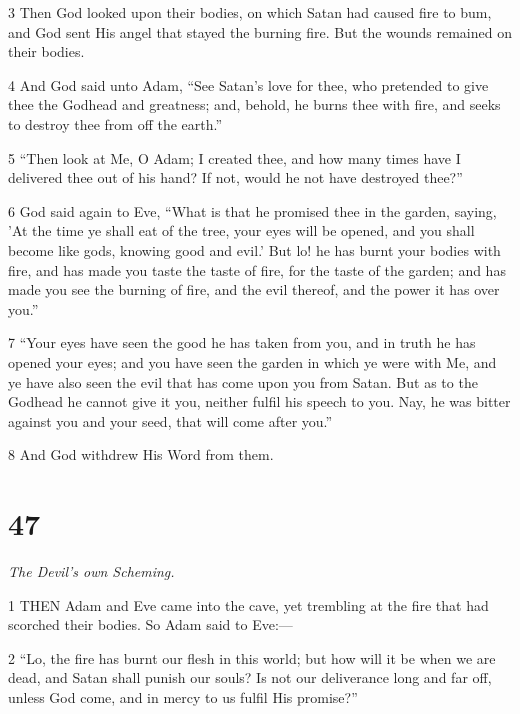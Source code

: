 \par 3 Then God looked upon their bodies, on which Satan had caused fire to bum, and God sent His angel that stayed the burning fire. But the wounds remained on their bodies.

\par 4 And God said unto Adam, “See Satan's love for thee, who pretended to give thee the Godhead and greatness; and, behold, he burns thee with fire, and seeks to destroy thee from off the earth.”

\par 5 “Then look at Me, O Adam; I created thee, and how many times have I delivered thee out of his hand? If not, would he not have destroyed thee?”

\par 6 God said again to Eve, “What is that he promised thee in the garden, saying, 'At the time ye shall eat of the tree, your eyes will be opened, and you shall become like gods, knowing good and evil.' But lo! he has burnt your bodies with fire, and has made you taste the taste of fire, for the taste of the garden; and has made you see the burning of fire, and the evil thereof, and the power it has over you.”

\par 7 “Your eyes have seen the good he has taken from you, and in truth he has opened your eyes; and you have seen the garden in which ye were with Me, and ye have also seen the evil that has come upon you from Satan. But as to the Godhead he cannot give it you, neither fulfil his speech to you. Nay, he was bitter against you and your seed, that will come after you.”

\par 8 And God withdrew His Word from them.

\chapter{47}

\par \textit{The Devil's own Scheming.}

\par 1 THEN Adam and Eve came into the cave, yet trembling at the fire that had scorched their bodies. So Adam said to Eve:—

\par 2 “Lo, the fire has burnt our flesh in this world; but how will it be when we are dead, and Satan shall punish our souls? Is not our deliverance long and far off, unless God come, and in mercy to us fulfil His promise?”

